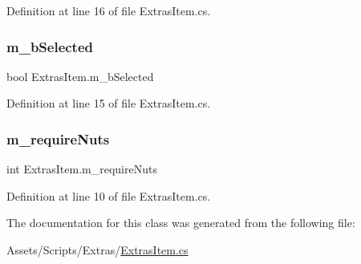 Definition at line 16 of file Extras\+Item.\+cs.

\mbox{\label{class_extras_item_a0532ece4d85246830027fc046eadbc61}} 
\subsubsection{\texorpdfstring{m\+\_\+b\+Selected}{m\_bSelected}}
{\footnotesize\ttfamily bool Extras\+Item.\+m\+\_\+b\+Selected\hspace{0.3cm}{\ttfamily [protected]}}



Definition at line 15 of file Extras\+Item.\+cs.

\mbox{\label{class_extras_item_aaf6ca43462a0d750cb8e5486b2dff5b5}} 
\subsubsection{\texorpdfstring{m\+\_\+require\+Nuts}{m\_requireNuts}}
{\footnotesize\ttfamily int Extras\+Item.\+m\+\_\+require\+Nuts}



Definition at line 10 of file Extras\+Item.\+cs.



The documentation for this class was generated from the following file\+:\begin{DoxyCompactItemize}
\item 
Assets/\+Scripts/\+Extras/\mbox{\hyperlink{_extras_item_8cs}{Extras\+Item.\+cs}}\end{DoxyCompactItemize}
